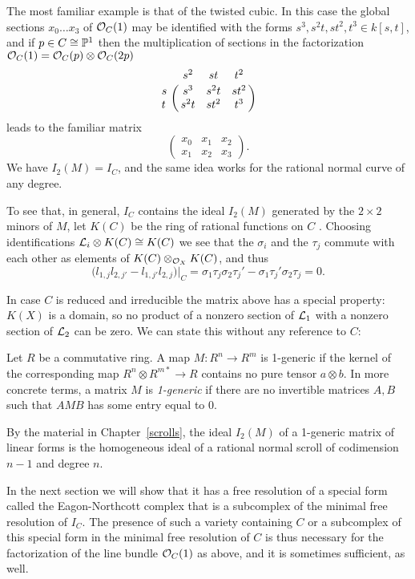 \begin{example}
The most familiar example is that of the twisted cubic. In this case the global sections $x_0\dots x_3$ of ${\mathcal O}_C(1)$ may be identified with the forms $s^3, s^2t, st^2, t^3 \in k[s,t]$, and if $p\in C \cong {\mathbb P}^1$ then the multiplication of sections
in the factorization  ${\mathcal O}_C(1) = {\mathcal O}_C(p) \otimes {\mathcal O}_C(2p)$ 
$$
\bordermatrix{
 &s^2&st&t^2\cr
 s& s^3&s^2t&st^2\cr
 t& s^2t&st^2&t^3
}
$$
 leads to the familiar matrix
$$
\begin{pmatrix}
x_0&x_1&x_2\\
x_1&x_2&x_3 
\end{pmatrix}.
$$
We have $I_2(M) = I_C$, and the same idea works for the rational normal curve of any degree.

\end{example}

To see that, in general, $I_C$ contains the ideal $I_2(M)$ generated by the $2\times 2$ minors of $M$, 
let $K(C)$ be the ring of rational functions on $C$ . Choosing identifications ${\mathcal L}_i\otimes K(C) \cong K(C)$ we see that the $\sigma_i$ and the $\tau_j$ commute with each other as elements of $K(C) \otimes_{{\mathcal O}_X} K(C)$, and thus 
$$
\bigl(l_{1,j} l_{2,j'}-l_{1,j'}l_{2,j}\bigr)|_C = \sigma_1\tau_j\sigma_2\tau_j' - \sigma_1\tau_j'\sigma_2\tau_j =0.
$$

In case $C$ is reduced and irreducible the matrix above has a special property: $K(X)$ is a domain, so no product of a nonzero
section of ${\mathcal L}_1$ with a nonzero section of ${\mathcal L}_2$ can be zero. We can state this without any reference to $C$:

\begin{definition}
Let $R$ be a commutative ring. A map $M:R^n\to R^m$ is 1-generic if the kernel of the corresponding
 map $R^{n}\otimes R^{m*} \to R$  contains no pure tensor $a\otimes b$. In more concrete terms, a matrix
$M$ is \emph{1-generic} if there are no invertible matrices $A,B$ such that  $AMB$ has some entry equal to 0.
\end{definition}

By the material in Chapter~\ref{scrolls}, the ideal $I_2(M)$ of a 1-generic matrix of linear forms is the homogeneous ideal of a rational normal 
scroll
of codimension $n-1$ and degree $n$. 

In the next section we will show that it has a free resolution of a special form called the 
Eagon-Northcott complex that is a subcomplex of the minimal free resolution of $I_C$. The presence of such a variety containing $C$ or
a subcomplex of this special form in the minimal free resolution of $C$ is thus necessary for the 
factorization of the line bundle ${\mathcal O}_C(1)$ as above, and it is sometimes sufficient, as well.

